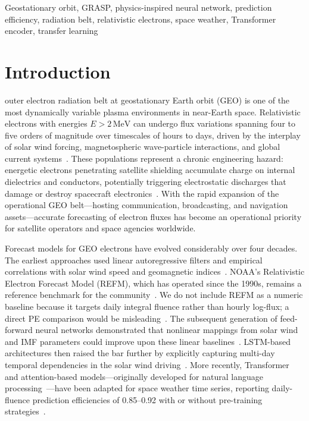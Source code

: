 \documentclass{ieeeaccess}
\begin{document}
\begin{keywords}
Geostationary orbit, GRASP, physics-inspired neural network, prediction
efficiency, radiation belt, relativistic electrons, space weather,
Transformer encoder, transfer learning
\end{keywords}

\titlepgskip=-15pt
\maketitle

\section{Introduction}
\label{sec:introduction}
 outer electron radiation belt at geostationary Earth orbit
(GEO) is one of the most dynamically variable plasma environments in near-Earth
space. Relativistic electrons with energies \(E>2\,\mathrm{MeV}\) can undergo
flux variations spanning four to five orders of magnitude over timescales of
hours to days, driven by the interplay of solar wind forcing, magnetospheric
wave-particle interactions, and global current systems~\cite{b1,b2,b3}. These
populations represent a chronic engineering hazard: energetic electrons
penetrating satellite shielding accumulate charge on internal dielectrics and
conductors, potentially triggering electrostatic discharges that damage or
destroy spacecraft electronics~\cite{b1}. With the rapid expansion of the
operational GEO belt---hosting communication, broadcasting, and navigation
assets---accurate forecasting of electron fluxes has become an operational
priority for satellite operators and space agencies worldwide.

Forecast models for GEO electrons have evolved considerably over four decades.
The earliest approaches used linear autoregressive filters and empirical
correlations with solar wind speed and geomagnetic indices~\cite{b4,b5}.
NOAA's Relativistic Electron Forecast Model (REFM), which has operated since
the 1990s, remains a reference benchmark for the community~\cite{b5}.
We do not include REFM as a numeric baseline because it targets daily integral
fluence rather than hourly log-flux; a direct PE comparison would be
misleading~\cite{b5}.
The subsequent generation of feed-forward neural networks demonstrated that
nonlinear mappings from solar wind and IMF parameters could improve upon these
linear baselines~\cite{b7,b8}. LSTM-based architectures then raised the bar
further by explicitly capturing multi-day temporal dependencies in the
solar wind driving~\cite{b9,b10,b11,b12}. More recently, Transformer and
attention-based models---originally developed for natural language
processing~\cite{b13}---have been adapted for space weather time series,
reporting daily-fluence prediction efficiencies of 0.85--0.92 with or without
pre-training strategies~\cite{b14,b15,b16}.
\end{document}

